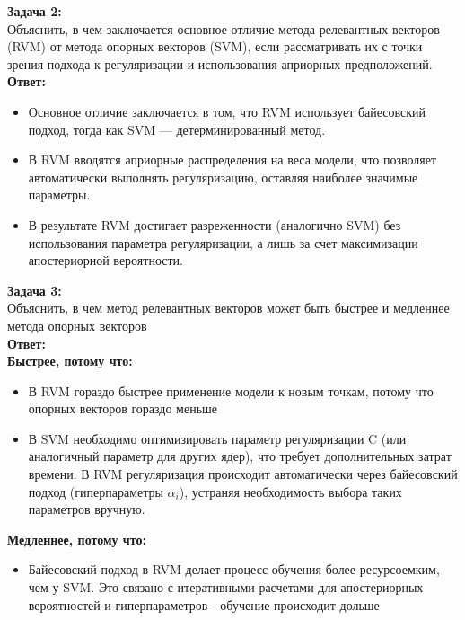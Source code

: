 \textbf{Задача 2:}\\
Объяснить, в чем заключается основное отличие метода релевантных векторов (RVM) от метода опорных векторов (SVM), если рассматривать их с точки зрения подхода к регуляризации и использования априорных предположений. \\
\textbf{Ответ:}
\begin{itemize}
    \item Основное отличие заключается в том, что RVM использует байесовский подход, тогда как SVM — детерминированный метод. 
    \item В RVM вводятся априорные распределения на веса модели, что позволяет автоматически выполнять регуляризацию, оставляя наиболее значимые параметры.
    \item В результате RVM достигает разреженности (аналогично SVM) без использования параметра регуляризации, а лишь за счет максимизации апостериорной вероятности.

\end{itemize}


\textbf{Задача 3:}\\
Объяснить, в чем метод релевантных векторов может быть быстрее и медленнее метода опорных векторов \\
\textbf{Ответ:} \\
\textbf{Быстрее, потому что:}
 \begin{itemize}
    \item В RVM гораздо быстрее применение модели к новым точкам, потому что опорных векторов гораздо меньше 
    \item В SVM необходимо оптимизировать параметр регуляризации C (или аналогичный параметр для других ядер), что требует дополнительных затрат времени. В RVM регуляризация происходит автоматически через байесовский подход (гиперпараметры $\alpha_i$), устраняя необходимость выбора таких параметров вручную.

\end{itemize}
\textbf{Медленнее, потому что:}
\begin{itemize}
    \item Байесовский подход в RVM делает процесс обучения более ресурсоемким, чем у SVM. Это связано с итеративными расчетами для апостериорных вероятностей и гиперпараметров - обучение происходит дольше
\end{itemize}

